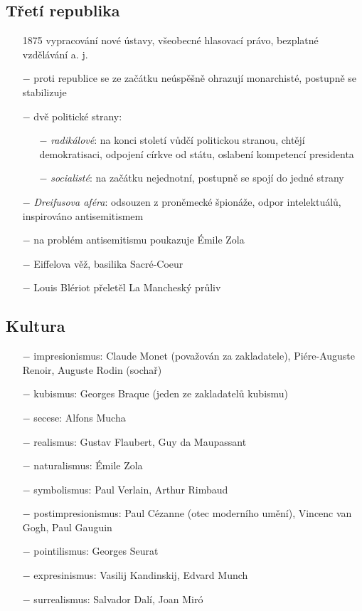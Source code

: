 \documentclass{article}
\begin{document}
\subsection*{Třetí republika}
\begin{itemize}
    \vspace{-0.5em}
    \setlength\itemsep{0.15em}
    \item[1875] vypracování nové ústavy, všeobecné hlasovací právo, bezplatné vzdělávání a. j.
    \item[$-$] proti republice se ze začátku neúspěšně ohrazují monarchisté, postupně se stabilizuje
    \item[$-$] dvě politické strany:
    \begin{itemize}
        \vspace{-0.5em}
        \setlength\itemsep{0.15em}
        \item[$-$] \textit{radikálové}: na konci století vůdčí politickou stranou, chtějí demokratisaci, odpojení církve od státu, oslabení kompetencí presidenta
        \item[$-$] \textit{socialisté}: na začátku nejednotní, postupně se spojí do jedné strany
    \end{itemize}
    \item[$-$] \textit{Dreifusova aféra}: odsouzen z proněmecké špionáže, odpor intelektuálů, inspirováno antisemitismem
    \item[$-$] na problém antisemitismu poukazuje Émile Zola
    \item[$-$] Eiffelova věž, basilika Sacré-Coeur
    \item[$-$] Louis Blériot přeletěl La Mancheský průliv
\end{itemize}

\subsection*{Kultura}
\begin{itemize}
    \vspace{-0.5em}
    \setlength\itemsep{0.15em}
    \item[$-$] impresionismus: Claude Monet (považován za zakladatele), Piére-Auguste Renoir, Auguste Rodin (sochař)
    \item[$-$] kubismus: Georges Braque (jeden ze zakladatelů kubismu)
    \item[$-$] secese: Alfons Mucha
    \item[$-$] realismus: Gustav Flaubert, Guy da Maupassant
    \item[$-$] naturalismus: Émile Zola
    \item[$-$] symbolismus: Paul Verlain, Arthur Rimbaud
    \item[$-$] postimpresionismus: Paul Cézanne (otec moderního umění), Vincenc van Gogh, Paul Gauguin
    \item[$-$] pointilismus: Georges Seurat
    \item[$-$] expresinismus: Vasilij Kandinskij, Edvard Munch
    \item[$-$] surrealismus: Salvador Dalí, Joan Miró
\end{itemize}
\end{document}
